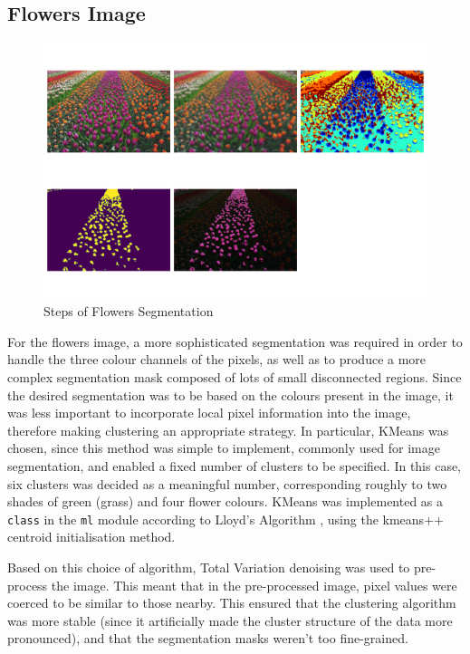 \documentclass[12pt]{article}
\begin{document}
\subsection{Flowers Image}

\begin{figure}[hp]
    \includegraphics[scale=0.35]{figures/flowers_segmentation.png}
    \caption{Steps of Flowers Segmentation}
    \label{fig:flowers}
\end{figure}

For the flowers image, a more sophisticated segmentation was required in order to handle the three colour channels of the pixels,
as well as to produce a more complex segmentation mask composed of lots of small disconnected regions.
Since the desired segmentation was to be based on the colours present in the image,
it was less important to incorporate local pixel information into the image,
therefore making clustering an appropriate strategy.
In particular, KMeans was chosen, since this method was simple to implement,
commonly used for image segmentation,
and enabled a fixed number of clusters to be specified.
In this case, six clusters was decided as a meaningful number,
corresponding roughly to two shades of green (grass) and four flower colours.
KMeans was implemented as a \texttt{class} in the \texttt{ml} module according to Lloyd's Algorithm \cite{lloyd},
using the kmeans++ \cite{kmeanspp} centroid initialisation method.

Based on this choice of algorithm, Total Variation denoising was used to pre-process the image.
This meant that in the pre-processed image, pixel values were coerced to be similar to those nearby.
This ensured that the clustering algorithm was more stable (since it artificially made the cluster structure of the data more pronounced),
and that the segmentation masks weren't too fine-grained.
\end{document}
